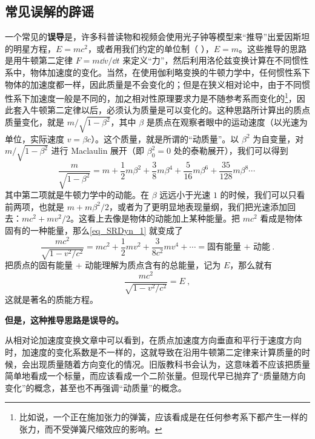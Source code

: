 \subsection{常见误解的辟谣}
一个常见的\textbf{误导}是，许多科普读物和视频会使用光子钟等模型来“推导”出爱因斯坦的明星方程，$E=mc^2$，或者用我们约定的单位制（ ），$E=m$。这些推导的思路是用牛顿第二定律 $F=m\dd v/\dd t$ 来定义“力”，然后利用洛伦兹变换计算在不同惯性系中，物体加速度的变化。当然，在使用伽利略变换的牛顿力学中，任何惯性系下物体的加速度都一样，因此质量是不会变化的；但是在狭义相对论中，由于不同惯性系下加速度一般是不同的，加之相对性原理要求力是不随参考系而变化的\footnote{比如说，一个正在施加张力的弹簧，应该看成是在任何参考系下都产生一样的张力，而不受弹簧尺缩效应的影响。}，因此套入牛顿第二定律以后，必须认为质量是可以变化的。这种思路所计算出的质点质量变化，就是 $m/\sqrt{1-\beta^2}$，其中 $\beta$ 是质点在观察者眼中的运动速度（以光速为单位，实际速度 $v = \beta c$）。这个质量，就是所谓的“动质量”。以 $\beta^2$ 为自变量，对 $m/\sqrt{1-\beta^2}$ 进行 Maclaulin 展开（即 $\beta_0^2=0$ 处的泰勒展开），我们可以得到
\begin{equation}\label{eq_SRDyn_1}
\frac{m}{\sqrt{1-\beta^2}} = m+\frac{1}{2}m\beta^2+\frac{3}{8}m\beta^4+\frac{5}{16}m\beta^6 + \frac{35}{128}m\beta^8\cdots~
\end{equation}
其中第二项就是牛顿力学中的动能。在 $\beta$ 远远小于光速 $1$ 的时候，我们可以只看前两项，也就是 $m+m\beta^2/2$，或者为了更明显地表现量纲，我们把光速添加回去：$mc^2+mv^2/2$。这看上去像是物体的动能加上某种能量。把 $mc^2$ 看成是物体固有的一种能量，那么\autoref{eq_SRDyn_1} 就变成了
\begin{equation}
\frac{mc^2}{\sqrt{1-v^2/c^2}} = mc^2+\frac{1}{2}mv^2+\frac{3}{8c^2}mv^4+\cdots=\text{固有能量 + 动能}~.
\end{equation}
把质点的固有能量 + 动能理解为质点含有的总能量，记为 $E$，那么就有
\begin{equation}
\frac{mc^2}{\sqrt{1-v^2/c^2}} = E~,
\end{equation}
这就是著名的质能方程。

\textbf{但是，这种推导思路是误导的。}


从相对论加速度变换文章中可以看到，在质点加速度方向垂直和平行于速度方向时，加速度的变化系数是不一样的，这就导致在沿用牛顿第二定律来计算质量的时候，会出现质量随着方向变化的情况。旧版教科书会认为，这意味着不应该把质量简单地看成一个标量，而应该看成一个二阶张量。但现代早已抛弃了“质量随方向变化”的概念，甚至也不再强调“动质量”的概念。

